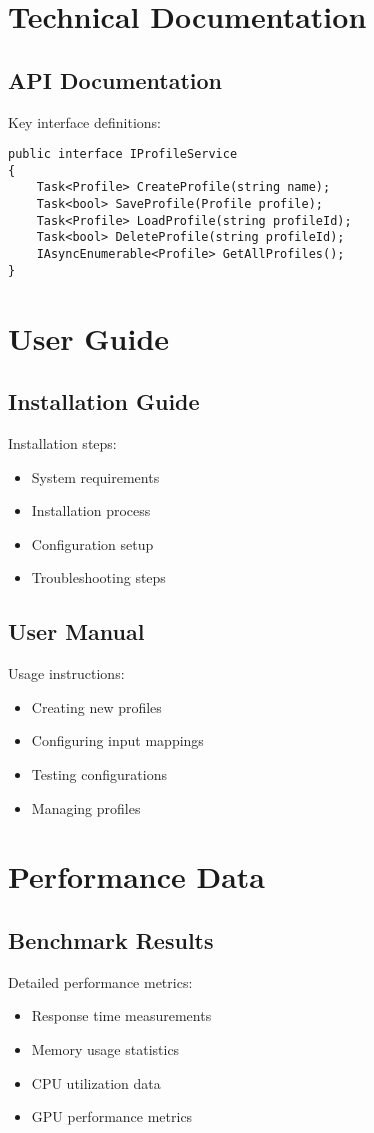 \section{Technical Documentation}
\subsection{API Documentation}
Key interface definitions:

\begin{verbatim}
public interface IProfileService
{
    Task<Profile> CreateProfile(string name);
    Task<bool> SaveProfile(Profile profile);
    Task<Profile> LoadProfile(string profileId);
    Task<bool> DeleteProfile(string profileId);
    IAsyncEnumerable<Profile> GetAllProfiles();
}
\end{verbatim}

\section{User Guide}
\subsection{Installation Guide}
Installation steps:
\begin{itemize}
    \item System requirements
    \item Installation process
    \item Configuration setup
    \item Troubleshooting steps
\end{itemize}

\subsection{User Manual}
Usage instructions:
\begin{itemize}
    \item Creating new profiles
    \item Configuring input mappings
    \item Testing configurations
    \item Managing profiles
\end{itemize}

\section{Performance Data}
\subsection{Benchmark Results}
Detailed performance metrics:
\begin{itemize}
    \item Response time measurements
    \item Memory usage statistics
    \item CPU utilization data
    \item GPU performance metrics
\end{itemize}

